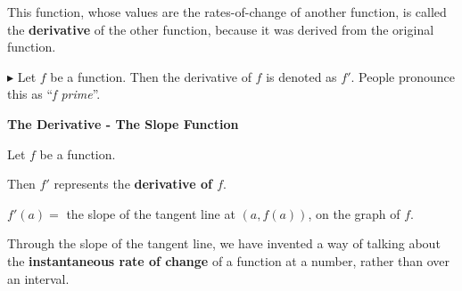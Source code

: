 \documentclass{ximera}
\begin{document}
This function, whose values are the rates-of-change of another function, is called the \textbf{derivative} of the other function, because it was derived from the original function.




$\blacktriangleright$ Let $f$ be a function.  Then the derivative of $f$ is denoted as $f'$. People pronounce this as ``\textit{f prime}''. \\



\begin{definition} \textbf{\textcolor{green!50!black}{The Derivative - The Slope Function}} 

Let $f$ be a function.

Then $f'$ represents the \textbf{derivative of $f$}.


$f'(a) = $ the slope of the tangent line at $(a, f(a))$, on the graph of $f$.




\end{definition}



Through the slope of the tangent line, we have invented a way of talking about the \textbf{\textcolor{purple!85!blue}{instantaneous rate of change}} of a function at a number, rather than over an interval. \\
\end{document}
